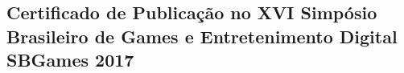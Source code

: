 
\begin{anexosenv}
\partanexos

\chapter{Certificado de Publicação no XVI Simpósio Brasileiro de Games e Entretenimento Digital SBGames 2017}

\label{chap:anexoA}



\end{anexosenv}
